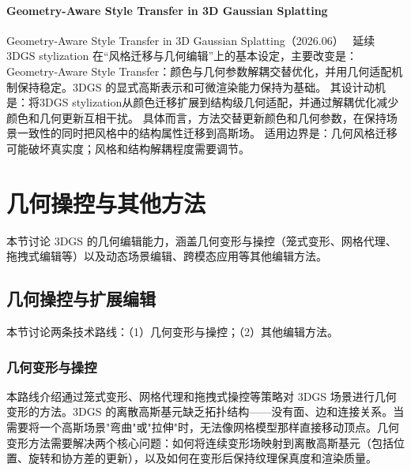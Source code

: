 \paragraph{Geometry-Aware Style Transfer in 3D Gaussian Splatting}
Geometry-Aware Style Transfer in 3D Gaussian Splatting（2026.06）~\cite{2606_24144} 延续 3DGS stylization 在“风格迁移与几何编辑”上的基本设定，主要改变是：Geometry-Aware Style Transfer：颜色与几何参数解耦交替优化，并用几何适配机制保持稳定。3DGS 的显式高斯表示和可微渲染能力保持为基础。
其设计动机是：将3DGS stylization从颜色迁移扩展到结构级几何适配，并通过解耦优化减少颜色和几何更新互相干扰。
具体而言，方法交替更新颜色和几何参数，在保持场景一致性的同时把风格中的结构属性迁移到高斯场。
适用边界是：几何风格迁移可能破坏真实度；风格和结构解耦程度需要调节。
\section{几何操控与其他方法}
\label{sec:09_3}

本节讨论 3DGS 的几何编辑能力，涵盖几何变形与操控（笼式变形、网格代理、拖拽式编辑等）以及动态场景编辑、跨模态应用等其他编辑方法。

\subsection{几何操控与扩展编辑}
\label{ss:09_3}

本节讨论两条技术路线：（1）几何变形与操控；（2）其他编辑方法。

\subsubsection{几何变形与操控}

本路线介绍通过笼式变形、网格代理和拖拽式操控等策略对 3DGS 场景进行几何变形的方法。3DGS 的离散高斯基元缺乏拓扑结构——没有面、边和连接关系。当需要将一个高斯场景"弯曲"或"拉伸"时，无法像网格模型那样直接移动顶点。几何变形方法需要解决两个核心问题：如何将连续变形场映射到离散高斯基元（包括位置、旋转和协方差的更新），以及如何在变形后保持纹理保真度和渲染质量。

